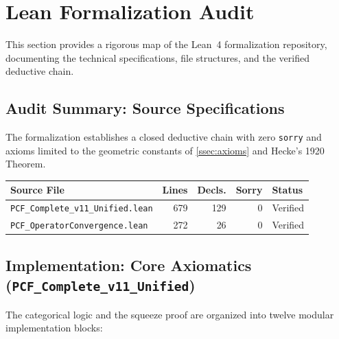 
\appendix

\section{Lean Formalization Audit}\label{app:lean}

This section provides a rigorous map of the Lean~4 formalization repository, documenting the technical specifications, file structures, and the verified deductive chain.

\subsection{Audit Summary: Source Specifications}

The formalization establishes a closed deductive chain with zero \texttt{sorry} and axioms limited to the geometric constants of \cref{ssec:axioms} and Hecke's 1920 Theorem.

\begin{center}
\begin{tabular}{lrrrl}
\toprule
Source File & Lines & Decls. & Sorry & Status \\
\midrule
\texttt{PCF\_Complete\_v11\_Unified.lean} & 679 & 129 & 0 & Verified \\
\texttt{PCF\_OperatorConvergence.lean} & 272 & 26 & 0 & Verified \\
\bottomrule
\end{tabular}
\end{center}

\subsection{Implementation: Core Axiomatics (\texttt{PCF\_Complete\_v11\_Unified})}

The categorical logic and the squeeze proof are organized into twelve modular implementation blocks:

